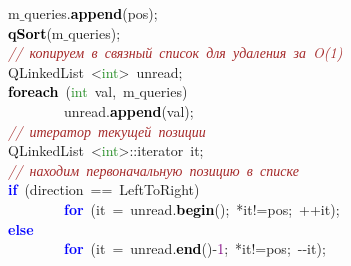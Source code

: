 \mbox{}\ \ \ \ \ \ \ \ m$\_$queries\textcolor{BrickRed}{.}\textbf{\textcolor{Black}{append}}\textcolor{BrickRed}{(}pos\textcolor{BrickRed}{);} \\
\mbox{}\ \ \ \ \ \ \ \ \textbf{\textcolor{Black}{qSort}}\textcolor{BrickRed}{(}m$\_$queries\textcolor{BrickRed}{);} \\
\mbox{}\ \ \ \ \ \ \ \ \textit{\textcolor{Brown}{//\ копируем\ в\ связный\ список\ для\ удаления\ за\ O(1)}} \\
\mbox{}\ \ \ \ \ \ \ \ QLinkedList\ \textcolor{BrickRed}{\textless{}}\textcolor{ForestGreen}{int}\textcolor{BrickRed}{\textgreater{}}\ unread\textcolor{BrickRed}{;} \\
\mbox{}\ \ \ \ \ \ \ \ \textbf{\textcolor{Black}{foreach}}\ \textcolor{BrickRed}{(}\textcolor{ForestGreen}{int}\ val\textcolor{BrickRed}{,}\ m$\_$queries\textcolor{BrickRed}{)} \\
\mbox{}\ \ \ \ \ \ \ \ \ \ \ \ \ \ \ \ unread\textcolor{BrickRed}{.}\textbf{\textcolor{Black}{append}}\textcolor{BrickRed}{(}val\textcolor{BrickRed}{);} \\
\mbox{}\ \ \ \ \ \ \ \ \textit{\textcolor{Brown}{//\ итератор\ текущей\ позиции}} \\
\mbox{}\ \ \ \ \ \ \ \ QLinkedList\ \textcolor{BrickRed}{\textless{}}\textcolor{ForestGreen}{int}\textcolor{BrickRed}{\textgreater{}::}\textcolor{TealBlue}{iterator}\ it\textcolor{BrickRed}{;} \\
\mbox{}\ \ \ \ \ \ \ \ \textit{\textcolor{Brown}{//\ находим\ первоначальную\ позицию\ в\ списке}} \\
\mbox{}\ \ \ \ \ \ \ \ \textbf{\textcolor{Blue}{if}}\ \textcolor{BrickRed}{(}direction\ \textcolor{BrickRed}{==}\ LeftToRight\textcolor{BrickRed}{)} \\
\mbox{}\ \ \ \ \ \ \ \ \ \ \ \ \ \ \ \ \textbf{\textcolor{Blue}{for}}\ \textcolor{BrickRed}{(}it\ \textcolor{BrickRed}{=}\ unread\textcolor{BrickRed}{.}\textbf{\textcolor{Black}{begin}}\textcolor{BrickRed}{();}\ \textcolor{BrickRed}{*}it\textcolor{BrickRed}{!=}pos\textcolor{BrickRed}{;}\ \textcolor{BrickRed}{++}it\textcolor{BrickRed}{);} \\
\mbox{}\ \ \ \ \ \ \ \ \textbf{\textcolor{Blue}{else}} \\
\mbox{}\ \ \ \ \ \ \ \ \ \ \ \ \ \ \ \ \textbf{\textcolor{Blue}{for}}\ \textcolor{BrickRed}{(}it\ \textcolor{BrickRed}{=}\ unread\textcolor{BrickRed}{.}\textbf{\textcolor{Black}{end}}\textcolor{BrickRed}{()-}\textcolor{Purple}{1}\textcolor{BrickRed}{;}\ \textcolor{BrickRed}{*}it\textcolor{BrickRed}{!=}pos\textcolor{BrickRed}{;}\ \textcolor{BrickRed}{-\/-}it\textcolor{BrickRed}{);} \\
